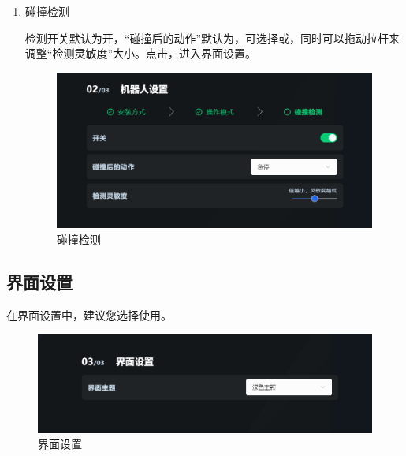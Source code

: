 \begin{enumerate}
\clearpage

\item 碰撞检测

	检测开关默认为开，“碰撞后的动作”默认为，可选择或，同时可以拖动拉杆来调整“检测灵敏度”大小。点击，进入界面设置。

	\begin{figure}[ht]
		\centering
		\includegraphics[width=\textwidth]{screen/2-8.png}
		\caption{碰撞检测}
		\label{fig:碰撞检测}
	\end{figure}


\end{enumerate}

\clearpage

\subsection{界面设置}

在界面设置中，建议您选择使用。

\begin{figure}[ht]
	\centering
	\includegraphics[width=\textwidth]{screen/2-9.png}
	\caption{界面设置}
	\label{fig:界面设置}
\end{figure}

